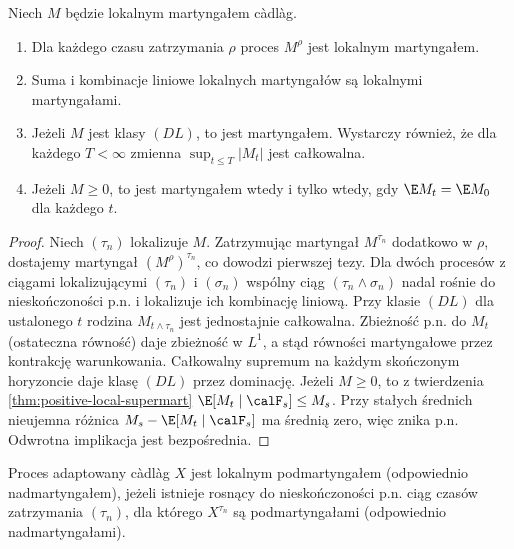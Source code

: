 \begin{twierdzenie}
\label{thm:local-mart-criteria}
Niech $M$ będzie lokalnym martyngałem c\`adl\`ag.
\begin{enumerate}
\item Dla każdego czasu zatrzymania $\rho$
proces $M^\rho$ jest lokalnym martyngałem.
\item Suma i kombinacje liniowe lokalnych
martyngałów są lokalnymi martyngałami.
\item Jeżeli $M$ jest klasy $(DL)$, to jest martyngałem.
Wystarczy również, że dla każdego $T<\infty$
zmienna $\sup_{t\le T}|M_t|$ jest całkowalna.
\item Jeżeli $M\ge0$, to jest martyngałem wtedy
i tylko wtedy, gdy $\E M_t=\E M_0$ dla każdego $t$.
\end{enumerate}
\end{twierdzenie}
\begin{proof}
Niech $(\tau_n)$ lokalizuje $M$.
Zatrzymując martyngał $M^{\tau_n}$ dodatkowo
w $\rho$, dostajemy martyngał
$(M^\rho)^{\tau_n}$, co dowodzi pierwszej tezy.
Dla dwóch procesów z ciągami lokalizującymi
$(\tau_n)$ i $(\sigma_n)$ wspólny ciąg
$(\tau_n\wedge\sigma_n)$ nadal rośnie do
nieskończoności p.n. i lokalizuje ich kombinację
liniową.
Przy klasie $(DL)$ dla ustalonego $t$
rodzina $M_{t\wedge\tau_n}$ jest jednostajnie
całkowalna. Zbieżność p.n. do $M_t$ (ostateczna
równość) daje zbieżność w $L^1$, a stąd
równości martyngałowe przez kontrakcję warunkowania.
Całkowalny supremum na każdym skończonym
horyzoncie daje klasę $(DL)$ przez dominację.
Jeżeli $M\ge0$, to z twierdzenia
\ref{thm:positive-local-supermart}
$\E[M_t\mid\calF_s]\le M_s$.
Przy stałych średnich nieujemna różnica
$M_s-\E[M_t\mid\calF_s]$ ma średnią zero,
więc znika p.n. Odwrotna implikacja jest
bezpośrednia.
\end{proof}

\begin{definicja}
Proces adaptowany c\`adl\`ag $X$ jest lokalnym
podmartyngałem (odpowiednio nadmartyngałem),
jeżeli istnieje rosnący do nieskończoności p.n.
ciąg czasów zatrzymania $(\tau_n)$, dla którego
$X^{\tau_n}$ są podmartyngałami
(odpowiednio nadmartyngałami).
\end{definicja}

